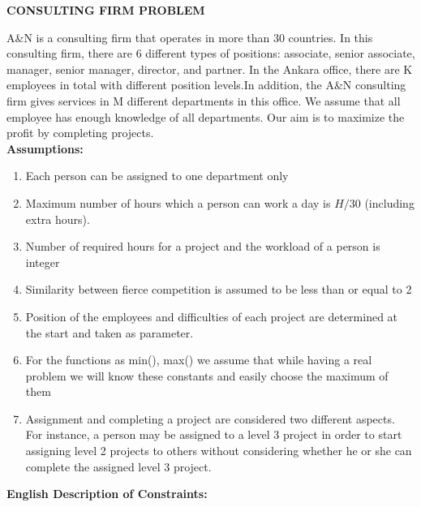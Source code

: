 \documentclass[11pt]{article}
\begin{document}
\begin{center}
{\bf CONSULTING FIRM PROBLEM}
\end{center}
A\&N is a consulting firm that operates in more than 30 countries. In this consulting firm, there are 6 different types of positions: associate, senior associate, manager, senior manager, director, and partner. In the Ankara office, there are K employees in total with different position levels.In addition, the A&N consulting firm gives services in M different departments in this office. We assume that all employee has enough knowledge of all departments. Our aim is to maximize the profit by completing projects.\\
{\bf Assumptions:} 
 \begin{enumerate} 
   \item Each person can be assigned to one department only
   \item Maximum number of hours which a person can work a day is $H/30$ (including extra hours).
   \item Number of required hours for a project and the workload of a person is integer
   \item Similarity between fierce competition is assumed to be less than or equal to 2
   \item Position of the employees and difficulties of each project are determined at the start and taken as parameter.
   \item For the functions as min(), max() we assume that while having a real problem we will know these constants and easily choose the maximum of them
   \item Assignment and completing a project are considered two different aspects. For instance, a person may be assigned to a level 3 project in order to start assigning level 2 projects to others without considering whether he or she can complete the assigned level 3 project.
   

    \end{enumerate}
{\bf English Description of Constraints:} 
\end{document}
